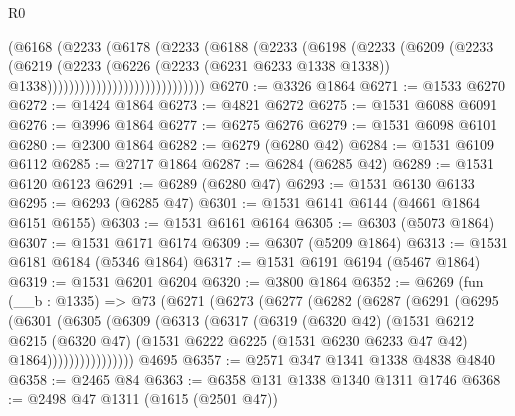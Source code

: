 \begin{lexlean}{R0}
\begin{coremodule}
                                    (@6168
                                      (@2233
                                        (@6178
                                          (@2233
                                            (@6188
                                              (@2233
                                                (@6198
                                                  (@2233
                                                    (@6209
                                                      (@2233
                                                        (@6219
                                                          (@2233
                                                            (@6226
                                                              (@2233 (@6231 @6233 @1338 @1338))
                                                              @1338)))))))))))))))))))))))))))))
@6270 := @3326 @1864
@6271 := @1533 @6270
@6272 := @1424 @1864
@6273 := @4821 @6272
@6275 := @1531 @6088 @6091
@6276 := @3996 @1864
@6277 := @6275 @6276
@6279 := @1531 @6098 @6101
@6280 := @2300 @1864
@6282 := @6279 (@6280 @42)
@6284 := @1531 @6109 @6112
@6285 := @2717 @1864
@6287 := @6284 (@6285 @42)
@6289 := @1531 @6120 @6123
@6291 := @6289 (@6280 @47)
@6293 := @1531 @6130 @6133
@6295 := @6293 (@6285 @47)
@6301 := @1531 @6141 @6144 (@4661 @1864 @6151 @6155)
@6303 := @1531 @6161 @6164
@6305 := @6303 (@5073 @1864)
@6307 := @1531 @6171 @6174
@6309 := @6307 (@5209 @1864)
@6313 := @1531 @6181 @6184 (@5346 @1864)
@6317 := @1531 @6191 @6194 (@5467 @1864)
@6319 := @1531 @6201 @6204
@6320 := @3800 @1864
@6352 := @6269
    (fun (__b : @1335) =>
    @73
      (@6271
        (@6273
          (@6277
            (@6282
              (@6287
                (@6291
                  (@6295
                    (@6301
                      (@6305
                        (@6309
                          (@6313
                            (@6317
                              (@6319
                                (@6320 @42)
                                (@1531
                                  @6212
                                  @6215
                                  (@6320 @47)
                                  (@1531
                                    @6222
                                    @6225
                                    (@1531 @6230 @6233 @47 @42)
                                    @1864))))))))))))))))
    @4695
@6357 := @2571 @347 @1341 @1338 @4838 @4840
@6358 := @2465 @84
@6363 := @6358 @131 @1338 @1340 @1311 @1746
@6368 := @2498 @47 @1311 (@1615 (@2501 @47))

\end{coremodule}
\end{lexlean}
